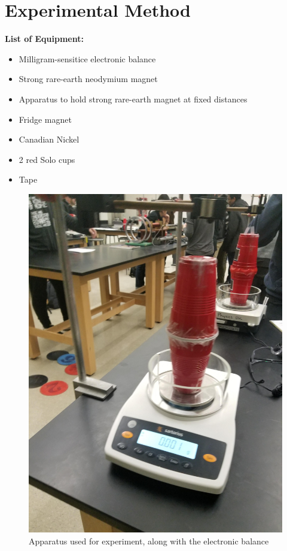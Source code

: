 \documentclass[letterpaper]{article}
\begin{document}
\section{Experimental Method}



\textbf{List of Equipment:}
\begin{itemize}
 \item Milligram-sensitice electronic balance
 \item Strong rare-earth neodymium magnet
 \item Apparatus to hold strong rare-earth magnet at fixed distances
 \item Fridge magnet
 \item Canadian Nickel
 \item 2 red Solo cups
 \item Tape
\end{itemize}

\begin{figure}[H]
 \centering
 \includegraphics[width=.4\textwidth]{apparatus.jpg}
 \caption{Apparatus used for experiment, along with the electronic balance}
\end{figure}
\end{document}
